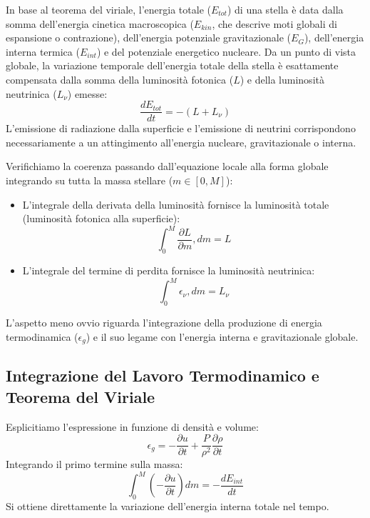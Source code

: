 In base al teorema del viriale, l'energia totale ($E_{tot}$) di una stella è data dalla somma dell'energia cinetica macroscopica ($E_{kin}$, che descrive moti globali di espansione o contrazione), dell'energia potenziale gravitazionale ($E_G$), dell'energia interna termica ($E_{int}$) e del potenziale energetico nucleare.
Da un punto di vista globale, la variazione temporale dell'energia totale della stella è esattamente compensata dalla somma della luminosità fotonica ($L$) e della luminosità neutrinica ($L_\nu$) emesse:
\begin{equation}
\frac{d E_{tot}}{dt} = - (L + L_\nu)
\end{equation}
L'emissione di radiazione dalla superficie e l'emissione di neutrini corrispondono necessariamente a un attingimento all'energia nucleare, gravitazionale o interna.

Verifichiamo la coerenza passando dall'equazione locale alla forma globale integrando su tutta la massa stellare ($m \in [0, M]$):
\begin{itemize}
\item L'integrale della derivata della luminosità fornisce la luminosità totale (luminosità fotonica alla superficie):
\begin{equation}
\int_0^M \frac{\partial L}{\partial m} , dm = L
\end{equation}
\item L'integrale del termine di perdita fornisce la luminosità neutrinica:
\begin{equation}
\int_0^M \epsilon_\nu , dm = L_\nu
\end{equation}
\end{itemize}

L'aspetto meno ovvio riguarda l'integrazione della produzione di energia termodinamica ($\epsilon_g$) e il suo legame con l'energia interna e gravitazionale globale.

\subsection{Integrazione del Lavoro Termodinamico e Teorema del Viriale}
Esplicitiamo l'espressione in funzione di densità e volume:
\begin{equation}
\epsilon_g = - \frac{\partial u}{\partial t} + \frac{P}{\rho^2} \frac{\partial \rho}{\partial t}
\end{equation}
Integrando il primo termine sulla massa:
\begin{equation}
\int_0^M \left( - \frac{\partial u}{\partial t} \right) dm = - \frac{d E_{int}}{dt}
\end{equation}
Si ottiene direttamente la variazione dell'energia interna totale nel tempo.

